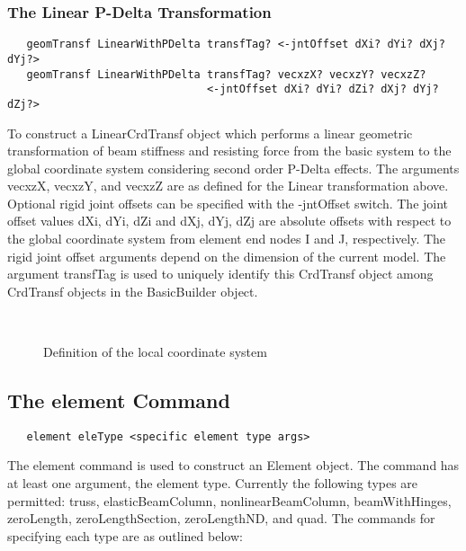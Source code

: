 \documentclass[12pt]{article}
\begin{document}
\subsubsection{The Linear P-Delta Transformation}
{\sf\small
\begin{verbatim}
   geomTransf LinearWithPDelta transfTag? <-jntOffset dXi? dYi? dXj? dYj?>
   geomTransf LinearWithPDelta transfTag? vecxzX? vecxzY? vecxzZ? 
                               <-jntOffset dXi? dYi? dZi? dXj? dYj? dZj?>
\end{verbatim}
}

To construct a LinearCrdTransf object which performs a linear geometric
transformation of beam stiffness and resisting force from the basic system
to the global coordinate system considering second order P-Delta
effects. The arguments vecxzX, vecxzY, and vecxzZ are as defined for
the Linear transformation above. Optional rigid joint offsets can be
specified with the -jntOffset switch. The joint offset values dXi,
dYi, dZi and dXj, dYj, dZj are absolute offsets with respect to the
global coordinate system from element end  nodes I and J,
respectively. The rigid joint offset arguments depend on the dimension
of the current model. The argument transfTag is used to uniquely
identify this CrdTransf object among CrdTransf objects in the BasicBuilder object.

\begin{figure}[htpb]
\begin{center}
\leavevmode
\hbox{%
}
\end{center}
\caption{Definition of the local coordinate system}
\label{localAxis}
\end{figure}

\subsection{The element Command}
{\sf\small
\begin{verbatim}
   element eleType <specific element type args>
\end{verbatim}
}

The element command is used to construct an Element object. The
command has at least one argument, the element type. Currently the
following types are permitted: truss, elasticBeamColumn,
nonlinearBeamColumn, beamWithHinges, zeroLength, zeroLengthSection,
zeroLengthND, and quad. The commands for specifying each type are as
outlined below:  
\end{document}
